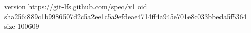 version https://git-lfs.github.com/spec/v1
oid sha256:889c1b9986507d2c5a2ee1c5a9efdeae4714ff4a945e701e8c033bbeda5f5364
size 100609
